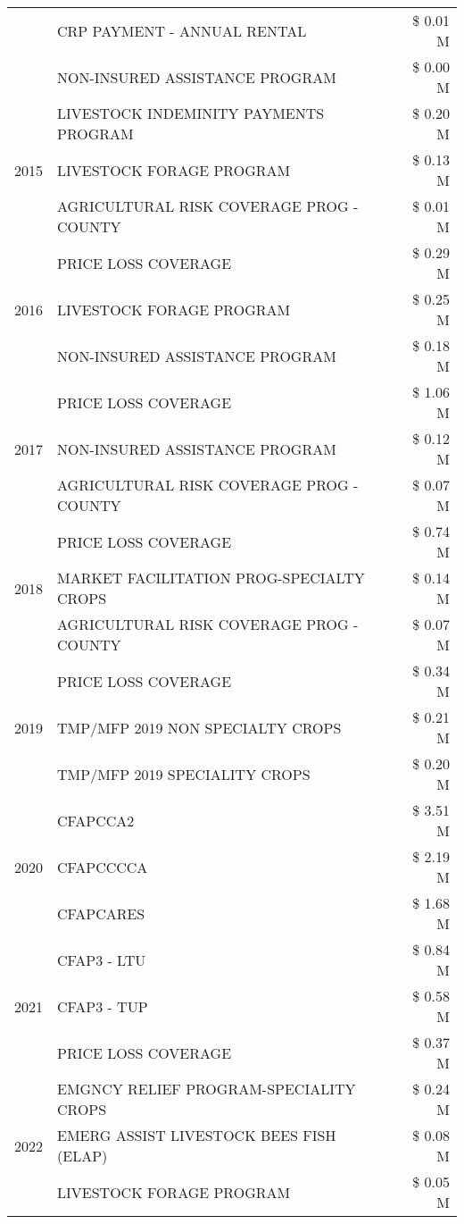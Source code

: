 \begin{tabular}{llr}
 & CRP PAYMENT - ANNUAL RENTAL & \$ 0.01 M \\
 & NON-INSURED ASSISTANCE PROGRAM & \$ 0.00 M \\
\cline{1-3}
\multirow[t]{3}{*}{2015} & LIVESTOCK INDEMINITY PAYMENTS PROGRAM & \$ 0.20 M \\
 & LIVESTOCK FORAGE PROGRAM & \$ 0.13 M \\
 & AGRICULTURAL RISK COVERAGE PROG - COUNTY & \$ 0.01 M \\
\cline{1-3}
\multirow[t]{3}{*}{2016} & PRICE LOSS COVERAGE & \$ 0.29 M \\
 & LIVESTOCK FORAGE PROGRAM & \$ 0.25 M \\
 & NON-INSURED ASSISTANCE PROGRAM & \$ 0.18 M \\
\cline{1-3}
\multirow[t]{3}{*}{2017} & PRICE LOSS COVERAGE & \$ 1.06 M \\
 & NON-INSURED ASSISTANCE PROGRAM & \$ 0.12 M \\
 & AGRICULTURAL RISK COVERAGE PROG - COUNTY & \$ 0.07 M \\
\cline{1-3}
\multirow[t]{3}{*}{2018} & PRICE LOSS COVERAGE & \$ 0.74 M \\
 & MARKET FACILITATION PROG-SPECIALTY CROPS & \$ 0.14 M \\
 & AGRICULTURAL RISK COVERAGE PROG - COUNTY & \$ 0.07 M \\
\cline{1-3}
\multirow[t]{3}{*}{2019} & PRICE LOSS COVERAGE & \$ 0.34 M \\
 & TMP/MFP 2019 NON SPECIALTY CROPS & \$ 0.21 M \\
 & TMP/MFP 2019 SPECIALITY CROPS & \$ 0.20 M \\
\cline{1-3}
\multirow[t]{3}{*}{2020} & CFAPCCA2 & \$ 3.51 M \\
 & CFAPCCCCA & \$ 2.19 M \\
 & CFAPCARES & \$ 1.68 M \\
\cline{1-3}
\multirow[t]{3}{*}{2021} & CFAP3 - LTU & \$ 0.84 M \\
 & CFAP3 - TUP & \$ 0.58 M \\
 & PRICE LOSS COVERAGE & \$ 0.37 M \\
\cline{1-3}
\multirow[t]{3}{*}{2022} & EMGNCY RELIEF PROGRAM-SPECIALITY CROPS & \$ 0.24 M \\
 & EMERG ASSIST LIVESTOCK BEES FISH (ELAP) & \$ 0.08 M \\
 & LIVESTOCK FORAGE PROGRAM & \$ 0.05 M \\
\cline{1-3}
\bottomrule
\end{tabular}
